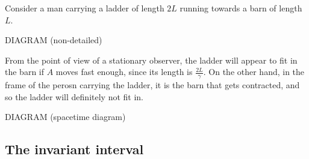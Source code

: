 \documentclass{../../template/note}
\begin{document}
    \begin{example*}
        Consider a man carrying a ladder of length \(2L\) running towards a barn of length \(L\).

        DIAGRAM (non-detailed)

        From the point of view of a stationary observer, the ladder will appear to fit in the barn if \(A\) moves fast enough, since its length is \(\frac{2L}{\gamma}\). On the other hand, in the frame of the perosn carrying the ladder, it is the barn that gets contracted, and so the ladder will definitely not fit in.

        DIAGRAM (spacetime diagram)
    \end{example*}
    
    \subsection{The invariant interval}
\end{document}
